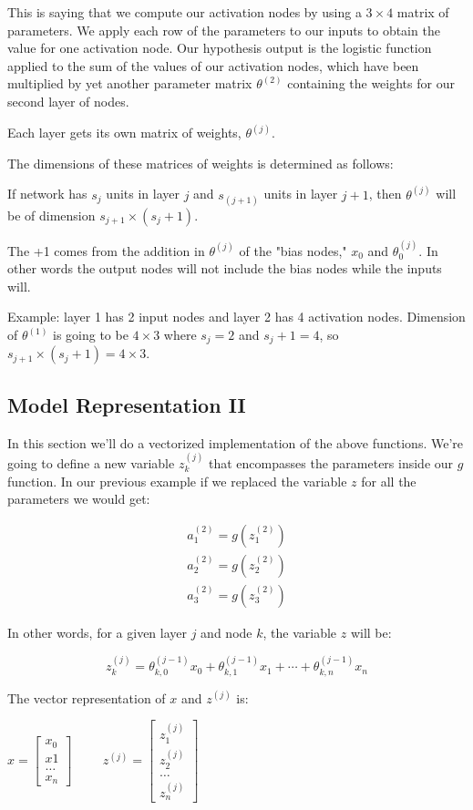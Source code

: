 \documentclass{article}
\begin{document}
This is saying that we compute our activation nodes by using a $3×4$ matrix of parameters. We apply each row of the parameters to our inputs to obtain the value for one activation node. Our hypothesis output is the logistic function applied to the sum of the values of our activation nodes, which have been multiplied by yet another parameter matrix $\theta^{(2)}$ containing the weights for our second layer of nodes.

Each layer gets its own matrix of weights, $\theta^{(j)}$.

The dimensions of these matrices of weights is determined as follows:

If network has $s_j$ units in layer $j$ and $s_(j+1)$ units in layer $j+1$, then $\theta^{(j)}$ will be of dimension $s_{j+1}×(s_j+1)$.

The +1 comes from the addition in $\theta^{(j)}$ of the "bias nodes," $x_0$ and $\theta_0^{(j)}$. In other words the output nodes will not include the bias nodes while the inputs will.

Example: layer 1 has 2 input nodes and layer 2 has 4 activation nodes. Dimension of $\theta^{(1)}$ is going to be $4×3$ where $s_j=2$ and $s_j+1=4$, so $s_{j+1}×(s_j+1)=4×3$.


\subsection{Model Representation II}

In this section we'll do a vectorized implementation of the above functions. We're going to define a new variable $z_k^{(j)}$ that encompasses the parameters inside our $g$ function. In our previous example if we replaced the variable $z$ for all the parameters we would get:

$$
\begin{matrix}
a_1^{(2)}=g(z_1^{(2)}) \\
a_2^{(2)}=g(z_2^{(2)}) \\
a_3^{(2)}=g(z_3^{(2)})
\end{matrix}
$$

In other words, for a given layer $j$ and node $k$, the variable $z$ will be:

$$z_k^{(j)}=\theta_{k,0}^{(j−1)}x_0+\theta_{k,1}^{(j−1)}x_1+\cdots +\theta_{k,n}^{(j−1)}x_n$$

The vector representation of $x$ and $z^{(j)}$ is:

$x=\left[\begin{matrix}
x_0 \\
x1  \\
\dots \\
x_n
\end{matrix}\right]
\hspace{1cm} z^{(j)}=\left[\begin{matrix}
z_1^{(j)} \\
z_2^{(j)} \\
\dots \\
z_n^{(j)}
\end{matrix}\right]
$
\end{document}

